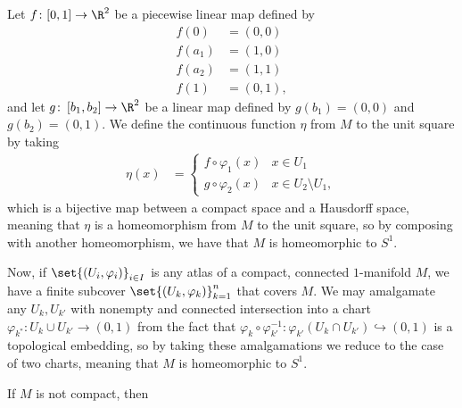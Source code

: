 \documentclass[10pt]{mypackage}
\begin{document}
\begin{solution}
  Let $f\colon [0,1]\rightarrow \R^{2}$ be a piecewise linear map defined by
  \begin{align*}
    f(0) &= (0,0)\\
    f\left( a_1 \right) &= (1,0)\\
    f\left( a_2 \right) &= (1,1)\\
    f\left( 1 \right) &= (0,1),
  \end{align*}
  and let $g\colon \left[ b_1,b_2 \right] \rightarrow \R^{2}$ be a linear map defined by $g\left( b_1 \right) = (0,0)$ and $g\left( b_2 \right) = (0,1)$. We define the continuous function $\eta$ from $M$ to the unit square by taking
  \begin{align*}
    \eta(x) &= \begin{cases}
      f\circ \varphi_1(x) & x\in U_1\\
      g\circ \varphi_2(x) & x\in U_2\setminus U_1,
    \end{cases}
  \end{align*}
  which is a bijective map between a compact space and a Hausdorff space, meaning that $\eta$ is a homeomorphism from $M$ to the unit square, so by composing with another homeomorphism, we have that $M$ is homeomorphic to $S^{1}$.\newline

  Now, if $\set{\left( U_i,\varphi_i \right)}_{i\in I}$ is any atlas of a compact, connected $1$-manifold $M$, we have a finite subcover $\set{\left( U_k,\varphi_k \right)}_{k=1}^{n}$ that covers $M$. We may amalgamate any $U_{k},U_{k'}$ with nonempty and connected intersection into a chart $\varphi_{k^{\ast}}\colon U_{k}\cup U_{k'}\rightarrow (0,1)$ from the fact that $\varphi_{k}\circ \varphi_{k'}^{-1}\colon \varphi_{k'}\left( U_k\cap U_{k'} \right)\hookrightarrow (0,1)$ is a topological embedding, so by taking these amalgamations we reduce to the case of two charts, meaning that $M$ is homeomorphic to $S^{1}$.\newline

  If $M$ is not compact, then 
\end{solution}
\end{document}
